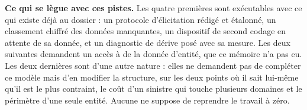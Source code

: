 \begin{cle}
\textbf{Ce qui se lègue avec ces pistes.} Les quatre premières sont exécutables avec ce qui existe
déjà au dossier : un protocole d'élicitation rédigé et étalonné, un classement chiffré des données
manquantes, un dispositif de second codage en attente de sa donnée, et un diagnostic de dérive posé
avec sa mesure. Les deux suivantes demandent un accès à de la donnée d'entité, que ce mémoire n'a
pas eu. Les deux dernières sont d'une autre nature : elles ne demandent pas de compléter ce modèle
mais d'en modifier la structure, sur les deux points où il sait lui-même qu'il est le plus
contraint, le coût d'un sinistre qui touche plusieurs domaines et le périmètre d'une seule entité.
Aucune ne suppose de reprendre le travail à zéro.
\end{cle}

